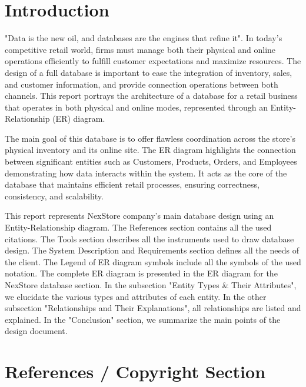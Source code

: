 \documentclass[11pt]{article}
\begin{document}
\listoffigures

\listoftables

\newpage

\section{Introduction}

"Data is the new oil, and databases are the engines that refine it". In today's competitive retail world, firms must manage both their physical and online operations efficiently to fulfill customer expectations and maximize resources. The design of a full database is important to ease the integration of inventory, sales, and customer information, and provide connection operations between both channels. This report portrays the architecture of a database for a retail business that operates in both physical and online modes, represented through an Entity-Relationship (ER) diagram.

The main goal of this database is to offer flawless coordination across the store's physical inventory and its online site. The ER diagram highlights the connection between significant entities such as Customers, Products, Orders, and Employees demonstrating how data interacts within the system. It acts as the core of the database that maintains efficient retail processes, ensuring correctness, consistency, and scalability.

This report represents NexStore company's main database design using an Entity-Relationship diagram. The References section contains all the used citations. The Tools section describes all the instruments used to draw database design. The System Description and Requirements section defines all the needs of the client. The Legend of ER diagram symbols include all the symbols of the used notation. The complete ER diagram is presented in the ER diagram for the NexStore database section. In the subsection "Entity Types \& Their Attributes", we elucidate the various types and attributes of each entity. In the other subsection "Relationships and Their Explanations", all relationships are listed and explained. In the "Conclusion" section, we summarize the main points of the design document.

\section{References / Copyright Section}
\end{document}
